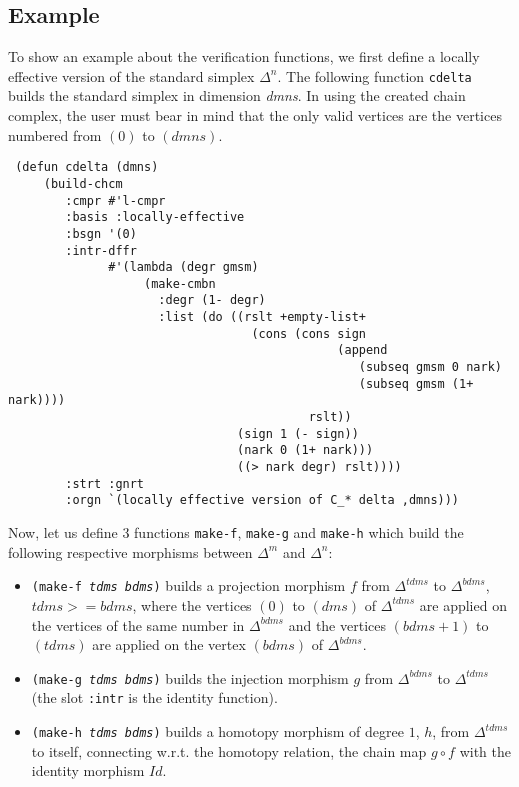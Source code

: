 \subsection* {Example}

To show an example about the verification functions, we first define a locally effective version
of the standard simplex $\Delta^n$. The following function {\tt cdelta} builds the standard simplex
in dimension {\em dmns}. In using the created chain complex, the user must bear in mind that
the only valid vertices are the vertices numbered from $(0)$ to $(dmns)$.
{\footnotesize\begin{verbatim}
 (defun cdelta (dmns)
     (build-chcm
        :cmpr #'l-cmpr
        :basis :locally-effective
        :bsgn '(0)
        :intr-dffr
              #'(lambda (degr gmsm)
                   (make-cmbn
                     :degr (1- degr)
                     :list (do ((rslt +empty-list+
                                  (cons (cons sign
                                              (append
                                                 (subseq gmsm 0 nark)
                                                 (subseq gmsm (1+ nark))))
                                          rslt))
                                (sign 1 (- sign))
                                (nark 0 (1+ nark)))
                                ((> nark degr) rslt))))
        :strt :gnrt
        :orgn `(locally effective version of C_* delta ,dmns)))
\end{verbatim}}
Now, let us define $3$ functions {\tt make-f}, {\tt make-g} and {\tt make-h} which build the
following respective morphisms between $\Delta^m$ and $\Delta^n$:
\begin{itemize}
\item {\tt (make-f {\em tdms bdms})} builds a projection morphism $f$ from $\Delta^{tdms}$ to $\Delta^{bdms}$,
$tdms>=bdms$, where the vertices $(0)$ to $(dms)$ of $\Delta^{tdms}$ are applied on the vertices of the same
number in $\Delta^{bdms}$ and the vertices $(bdms+1)$ to $(tdms)$ are applied on the vertex $(bdms)$ of
$\Delta^{bdms}$.
\item {\tt (make-g {\em tdms bdms})} builds the injection morphism $g$ from $\Delta^{bdms}$ to $\Delta^{tdms}$
(the slot {\tt :intr} is the identity function).
\item {\tt (make-h {\em tdms bdms})} builds a homotopy morphism of degree $1$, $h$,
from $\Delta^{tdms}$ to itself, connecting w.r.t. the homotopy relation, the chain map
$g \circ f$ with the identity morphism $Id$.
\end{itemize}

